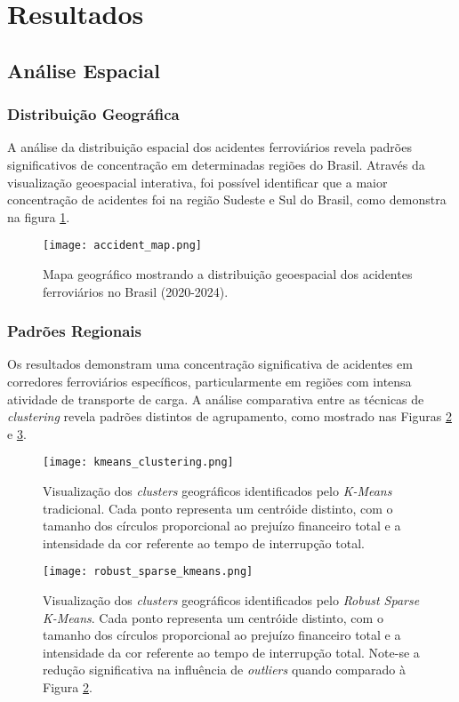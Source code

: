 \documentclass[conference]{IEEEtran}
\begin{document}
\section{Resultados}

\subsection{Análise Espacial}

\subsubsection{Distribuição Geográfica}
A análise da distribuição espacial dos acidentes ferroviários revela padrões significativos de concentração em determinadas regiões do Brasil. Através da visualização geoespacial interativa, foi possível identificar que a maior concentração de acidentes foi na região Sudeste e Sul do Brasil, como demonstra na figura \ref{fig:accident_map}.

\begin{figure}[h]
    \centering
    \texttt{[image: accident\_map.png]}
    \caption{Mapa geográfico mostrando a distribuição geoespacial dos acidentes ferroviários no Brasil (2020-2024).}
    \label{fig:accident_map}
\end{figure}


\subsubsection{Padrões Regionais}
Os resultados demonstram uma concentração significativa de acidentes em corredores ferroviários específicos, particularmente em regiões com intensa atividade de transporte de carga. A análise comparativa entre as técnicas de \textit{clustering} revela padrões distintos de agrupamento, como mostrado nas Figuras \ref{fig:cluster_map} e \ref{fig:robust_sparse_kmeans}.

\begin{figure}[!htb]
    \centering
    \texttt{[image: kmeans\_clustering.png]}
    \caption{Visualização dos \textit{clusters} geográficos identificados pelo \textit{K-Means} tradicional. Cada ponto representa um centróide distinto, com o tamanho dos círculos proporcional ao prejuízo financeiro total e a intensidade da cor referente ao tempo de interrupção total.}
    \label{fig:cluster_map}
\end{figure}

\begin{figure}[!htb]
    \centering
    \texttt{[image: robust\_sparse\_kmeans.png]}
    \caption{Visualização dos \textit{clusters} geográficos identificados pelo \textit{Robust Sparse K-Means}. Cada ponto representa um centróide distinto, com o tamanho dos círculos proporcional ao prejuízo financeiro total e a intensidade da cor referente ao tempo de interrupção total. Note-se a redução significativa na influência de \textit{outliers} quando comparado à Figura \ref{fig:cluster_map}.}
    \label{fig:robust_sparse_kmeans}
\end{figure}
\end{document}
